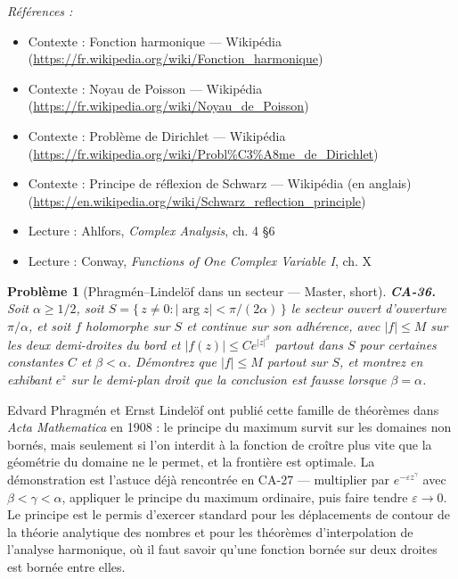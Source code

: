 \documentclass[11pt]{article}
\newtheorem{problem}{Problème}
\newenvironment{refs}{\par\small\noindent\emph{Références :}\begin{itemize}\setlength\itemsep{0pt}}{\end{itemize}\normalsize}
\begin{document}
\begin{refs}
\item Contexte : Fonction harmonique --- Wikipédia (\url{https://fr.wikipedia.org/wiki/Fonction_harmonique})
\item Contexte : Noyau de Poisson --- Wikipédia (\url{https://fr.wikipedia.org/wiki/Noyau_de_Poisson})
\item Contexte : Problème de Dirichlet --- Wikipédia (\url{https://fr.wikipedia.org/wiki/Probl%C3%A8me_de_Dirichlet})
\item Contexte : Principe de réflexion de Schwarz --- Wikipédia (en anglais) (\url{https://en.wikipedia.org/wiki/Schwarz_reflection_principle})
\item Lecture : Ahlfors, \textit{Complex Analysis}, ch. 4 \S{}6
\item Lecture : Conway, \textit{Functions of One Complex Variable I}, ch. X
\end{refs}

\bigskip

\begin{problem}[{Phragmén--Lindelöf dans un secteur --- Master, short}]
\textbf{CA-36.} Soit $ \alpha \ge 1/2 $, soit
$ S = \{\, z \ne 0 : |\arg z| < \pi/(2\alpha) \,\} $ le secteur ouvert d'ouverture
$ \pi/\alpha $, et soit $ f $ holomorphe sur $ S $ et continue sur son adhérence, avec
$ |f| \le M $ sur les deux demi-droites du bord et $ |f(z)| \le C e^{|z|^{\beta}} $ partout dans
$ S $ pour certaines constantes $ C $ et $ \beta < \alpha $. Démontrez que $ |f| \le M $
partout sur $ S $, et montrez en exhibant $ e^{z} $ sur le demi-plan droit que la conclusion est
fausse lorsque $ \beta = \alpha $.
\end{problem}

\noindent Edvard Phragmén et Ernst Lindelöf ont publié cette famille de théorèmes dans
\textit{Acta Mathematica} en 1908 : le principe du maximum survit sur les domaines non bornés, mais
seulement si l'on interdit à la fonction de croître plus vite que la géométrie du domaine ne le
permet, et la frontière est optimale. La démonstration est l'astuce déjà rencontrée en CA-27 ---
multiplier par $ e^{-\varepsilon z^{\gamma}} $ avec $ \beta < \gamma < \alpha $, appliquer
le principe du maximum ordinaire, puis faire tendre $ \varepsilon \to 0 $. Le principe est le
permis d'exercer standard pour les déplacements de contour de la théorie analytique des nombres et
pour les théorèmes d'interpolation de l'analyse harmonique, où il faut savoir qu'une fonction bornée
sur deux droites est bornée entre elles.
\end{document}
